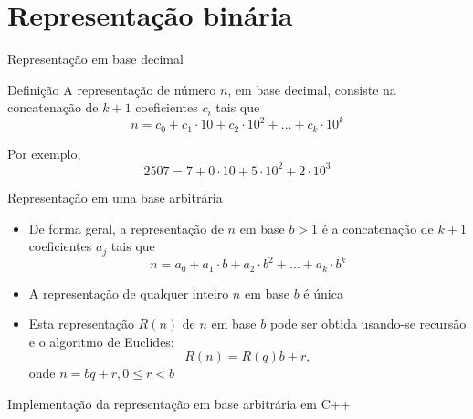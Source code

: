 \section*{Representação binária}

\begin{frame}[fragile]{Representação em base decimal}

    \begin{block}{Definição}
        A representação de número $n$, em base decimal, consiste na concatenação de $k + 1$ coeficientes $c_i$ tais que
        $$
        n = c_0 + c_1\cdot 10 + c_2\cdot 10^2 + \ldots + c_k\cdot 10^k
        $$
    \end{block}

    \vspace{0.2in}

    Por exemplo,
$$
            2507 = 7 + 0\cdot 10 + 5\cdot 10^2 + 2\cdot 10^3
$$

\end{frame}

\begin{frame}[fragile]{Representação em uma base arbitrária}

    \begin{itemize}
        \item De forma geral, a representação de $n$ em base $b > 1$ é a concatenação de $k + 1$ coeficientes $a_j$ tais que
$$
n = a_0 + a_1\cdot b + a_2\cdot b^2 + \ldots + a_k\cdot b^k
$$

        \item A representação de qualquer inteiro $n$ em base $b$ é única

        \item Esta representação $R(n)$ de $n$ em base $b$ pode ser obtida usando-se recursão e o algoritmo de Euclides: 
$$R(n) = R(q)b + r,$$
        onde $n = bq + r, 0 \leq r < b$
    \end{itemize}

\end{frame}

\begin{frame}[fragile]{Implementação da representação em base arbitrária em C++}
\end{frame}

